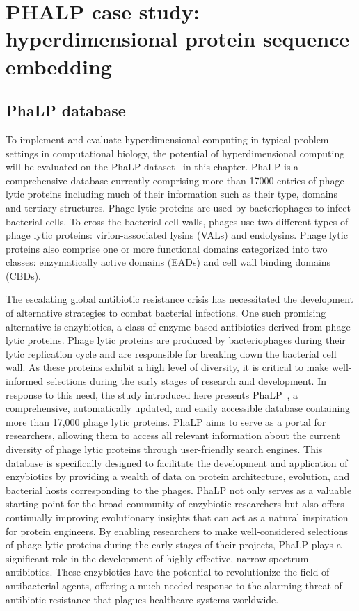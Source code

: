 \chapter{PHALP case study:\\hyperdimensional protein sequence embedding}
\section{PhaLP database}
To implement and evaluate hyperdimensional computing in typical problem settings in computational biology, the potential of hyperdimensional computing will be evaluated on the PhaLP dataset~\cite{phalp} in this chapter. PhaLP is a comprehensive database currently comprising more than 17000 entries of phage lytic proteins including much of their information such as their type, domains and tertiary structures. Phage lytic proteins are used by bacteriophages to infect bacterial cells. To cross the bacterial cell walls, phages use two different types of phage lytic proteins: virion-associated lysins (VALs) and endolysins. Phage lytic proteins also comprise one or more functional domains categorized into two classes: enzymatically active domains (EADs) and cell wall binding domains (CBDs).

The escalating global antibiotic resistance crisis has necessitated the development of alternative strategies to combat bacterial infections. One such promising alternative is enzybiotics, a class of enzyme-based antibiotics derived from phage lytic proteins. Phage lytic proteins are produced by bacteriophages during their lytic replication cycle and are responsible for breaking down the bacterial cell wall. As these proteins exhibit a high level of diversity, it is critical to make well-informed selections during the early stages of research and development. In response to this need, the study introduced here presents PhaLP~\cite{phalp}, a comprehensive, automatically updated, and easily accessible database containing more than 17,000 phage lytic proteins. PhaLP aims to serve as a portal for researchers, allowing them to access all relevant information about the current diversity of phage lytic proteins through user-friendly search engines. This database is specifically designed to facilitate the development and application of enzybiotics by providing a wealth of data on protein architecture, evolution, and bacterial hosts corresponding to the phages. PhaLP not only serves as a valuable starting point for the broad community of enzybiotic researchers but also offers continually improving evolutionary insights that can act as a natural inspiration for protein engineers. By enabling researchers to make well-considered selections of phage lytic proteins during the early stages of their projects, PhaLP plays a significant role in the development of highly effective, narrow-spectrum antibiotics. These enzybiotics have the potential to revolutionize the field of antibacterial agents, offering a much-needed response to the alarming threat of antibiotic resistance that plagues healthcare systems worldwide.

